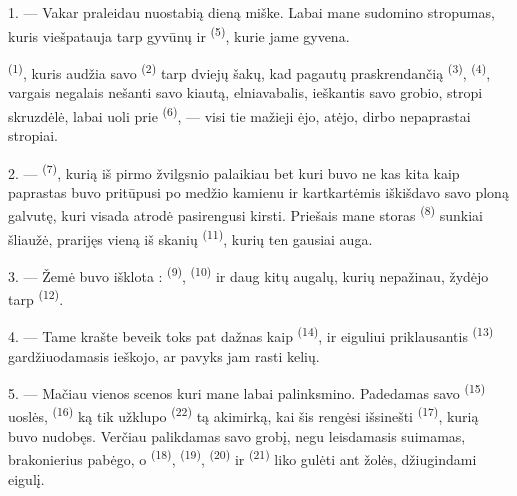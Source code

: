\VUsaut{3.0mm}
\VUsaut{3.0mm}

\VUsaut{3.0mm}

1. --- Vakar praleidau nuostabią dieną miške. Labai mane sudomino stropumas, kuris
viešpatauja tarp gyvūnų ir  \textsuperscript{(5)}, kurie jame gyvena.

 \textsuperscript{(1)}, kuris audžia savo 
\textsuperscript{(2)} tarp dviejų šakų, kad pagautų praskrendančią 
\textsuperscript{(3)},  \textsuperscript{(4)}, vargais negalais nešanti
savo kiautą, elniavabalis, ieškantis savo grobio, stropi skruzdėlė, labai uoli prie
 \textsuperscript{(6)}, --- visi tie mažieji ėjo, atėjo, dirbo
nepaprastai stropiai.

2. ---  \textsuperscript{(7)}, kurią iš pirmo žvilgsnio palaikiau
 bet kuri buvo ne kas kita kaip paprastas  buvo
pritūpusi po medžio kamienu ir kartkartėmis iškišdavo savo ploną galvutę, kuri visada
atrodė pasirengusi kirsti. Priešais mane storas 
\textsuperscript{(8)} sunkiai šliaužė, prarijęs vieną iš skanių 
\textsuperscript{(11)}, kurių ten gausiai auga.

3. --- Žemė buvo išklota : 
\textsuperscript{(9)},  \textsuperscript{(10)} ir daug kitų augalų,
kurių nepažinau, žydėjo tarp  \textsuperscript{(12)}.

4. --- Tame krašte  beveik toks pat dažnas kaip 
\textsuperscript{(14)}, ir eiguliui priklausantis 
\textsuperscript{(13)} gardžiuodamasis ieškojo, ar pavyks jam rasti kelių.

\VUsaut{3.0mm}
\VUsaut{3.0mm}

5. --- Mačiau vienos scenos  kuri mane labai palinksmino.
Padedamas savo  \textsuperscript{(15)} uoslės,
 \textsuperscript{(16)} ką tik užklupo 
\textsuperscript{(22)} tą akimirką, kai šis rengėsi išsinešti 
\textsuperscript{(17)}, kurią buvo nudobęs. Verčiau palikdamas savo grobį, negu
leisdamasis suimamas, brakonierius pabėgo, o 
\textsuperscript{(18)},  \textsuperscript{(19)}, 
\textsuperscript{(20)} ir  \textsuperscript{(21)} liko gulėti ant
žolės, džiugindami eigulį.

